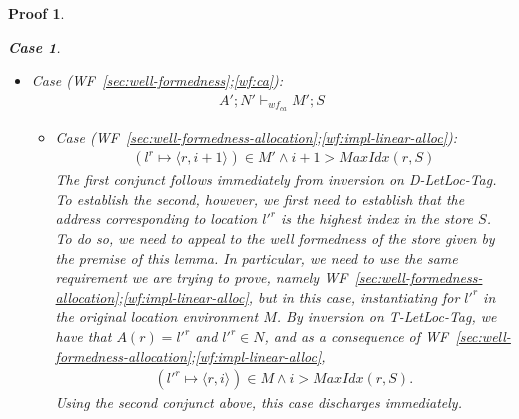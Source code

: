 \documentclass[showabstract,showacknowledgments,showpreface,showdedication,school]{iuphd}
\newtheorem*{bcase}{Case}
\theoremstyle{nonumberplain}
\newtheorem{nproof}{Proof}
\newcommand{\keywd}[1]{\mathit{#1}}
\newcommand{\skeywd}[1]{\mathit{#1}}
\newcommand{\loc}{\skeywd{l}}
\newcommand{\concreteloc}[3]{\ensuremath{\langle #1, #2 \rangle ^{#3}}}
\newcommand{\reg}{\skeywd{r}}
\newcommand{\ind}{\keywd{i}}
\newcommand{\STOR}{\keywd{S}}
\newcommand{\MENV}{\keywd{M}}
\newcommand{\AENV}{\keywd{A}}
\newcommand{\NENV}{\keywd{N}}
\newcommand{\locreg}[2]{\ensuremath{{#1}^{#2}}}
\newcommand{\allocptr}[2]{\keywd{MaxIdx}(#1,#2)}
\newcommand{\storewfca}[4]{\ensuremath{#1;#2 \vdash_{wf_{ca}} #3;#4}}
\newcommand{\refwellformed}[2]{WF~\ref{#1};\ref{#2}}
\newcommand{\dletloctag}{D-LetLoc-Tag}
\newcommand{\tlltag}{T-LetLoc-Tag}
\begin{document}
\begin{nproof}
\begin{bcase}
\begin{itemize}
\begin{itemize}
      Of the requirements for this judgement, the only one that is
      not satisfied immediately by the well formedness of the store
      given in the premise of the lemma is requirement
      \refwellformed{sec:well-formedness-constructors}{wfconstr:constraint-tag}
      The specific requirement is to establish that
      \begin{align*}
      (\locreg{\loc'}{\reg} \mapsto \concreteloc{\reg}{\ind}{})  \in \MENV' \wedge \\
      (\locreg{\loc}{\reg} \mapsto \concreteloc{\reg}{\ind + 1}{})  \in \MENV',
      \end{align*}
      which follows immediately by inversion on \dletloctag{}.
      \item Case (\refwellformed{sec:well-formedness}{wf:ca}):
      \begin{align*}
      \storewfca{\AENV'}{\NENV'}{\MENV'}{\STOR}
      \end{align*}
        \begin{itemize}
        \item Case (\refwellformed{sec:well-formedness-allocation}{wf:impl-linear-alloc}):
        \begin{align*}
                  (\locreg{\loc}{\reg} \mapsto \concreteloc{\reg}{\ind+1}{}) \in \MENV' \wedge
\ind+1 > \allocptr{\reg}{\STOR}
        \end{align*}
        The first conjunct follows immediately from inversion on \dletloctag{}.
        To establish the second, however, we first need to establish
        that the address corresponding to location $\locreg{\loc'}{\reg}$ is the highest index in
        the store $\STOR$.
        To do so, we need to appeal to the well formedness of the store given by the
        premise of this lemma.
        In particular, we need to use the same requirement we are trying to prove,
        namely \refwellformed{sec:well-formedness-allocation}{wf:impl-linear-alloc}, but in this case,
        instantiating for $\locreg{\loc'}{\reg}$ in the original location environment $\MENV$.
        By inversion on \tlltag{}, we have that $\AENV(\reg) = \locreg{\loc'}{\reg}$ and $\locreg{\loc'}{\reg} \in \NENV$,
        and as a consequence of \refwellformed{sec:well-formedness-allocation}{wf:impl-linear-alloc},
        \begin{align*}
                  (\locreg{\loc'}{\reg} \mapsto \concreteloc{\reg}{\ind}{}) \in \MENV \wedge
\ind > \allocptr{\reg}{\STOR}.
        \end{align*}
        Using the second conjunct above, this case discharges immediately.

\end{itemize}
\end{itemize}
\end{itemize}
\end{bcase}
\end{nproof}
\end{document}
